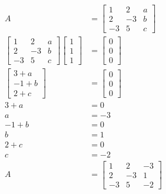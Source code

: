 \documentclass[main.tex]{subfiles}
\begin{document}
\begin{enumerate}
\begin{enumerate}
        $$
        \begin{aligned}
        A&=\left[\begin{array}{ccc}
        1 & 2 & a \\
        2 & -3 & b \\
        -3 & 5 & c
        \end{array}\right]\\
        \left[\begin{array}{ccc}
        1 & 2 & a \\
        2 & -3 & b \\
        -3 & 5 & c
        \end{array}\right]\left[\begin{array}{l}
        1 \\
        1 \\
        1
        \end{array}\right]&=\left[\begin{array}{l}
        0 \\
        0 \\
        0
        \end{array}\right]\\
        \left[\begin{array}{c}
        3+a \\
        -1+b \\
        2+c
        \end{array}\right]&=\left[\begin{array}{l}
        0 \\
        0 \\
        0
        \end{array}\right]\\
        3+a & =0 \\
        a  &= -3 \\
        -1+b & =0 \\
        b &= 1 \\
        2+c &= 0 \\
        c &= -2 \\
        A &= \left[\begin{array}{ccc}
        1 & 2 & -3 \\
        2 & -3 & 1 \\
        -3 & 5 & -2
        \end{array}\right]
        \end{aligned}
        $$
        

\end{enumerate}
\end{enumerate}
\end{document}
